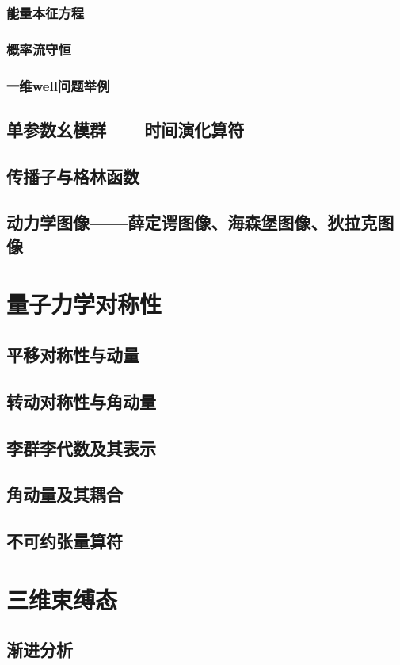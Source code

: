 \documentclass{book}
\begin{document}
\subsection{能量本征方程}
\subsection{概率流守恒}
\subsection{一维well问题举例}
\section{单参数幺模群——时间演化算符}
\section{传播子与格林函数}
\section{动力学图像——薛定谔图像、海森堡图像、狄拉克图像}
\chapter{量子力学对称性}
\section{平移对称性与动量}
\section{转动对称性与角动量}
\section{李群李代数及其表示}
\section{角动量及其耦合}
\section{不可约张量算符}
\chapter{三维束缚态}
\section{渐进分析}
\end{document}
